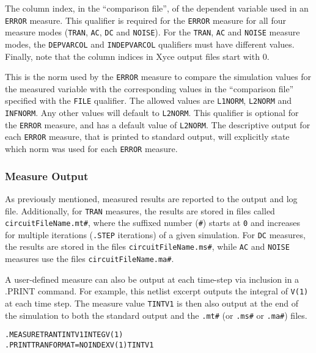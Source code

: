 \begin{Command}
\begin{Arguments}
The column index, in the ``comparison file'', of the dependent
variable used in an {\tt ERROR} measure.  This qualifier is required
for the {\tt ERROR} measure for all four measure modes ({\tt TRAN},
{\tt AC}, {\tt DC} and {\tt NOISE}).  For the {\tt TRAN}, {\tt AC} and
{\tt NOISE} measure modes, the {\tt DEPVARCOL} and {\tt INDEPVARCOL}
qualifiers must have different values.  Finally, note
that the column indices in Xyce output files start with 0.

This is the norm used by the {\tt ERROR} measure to compare the
simulation values for the measured variable with the corresponding
values in the ``comparison file'' specified with the {\tt FILE}
qualifier.  The allowed values are {\tt L1NORM}, {\tt L2NORM} and {\tt
INFNORM}.  Any other values will default to {\tt L2NORM}.  This
qualifier is optional for the {\tt ERROR} measure, and has a default
value of {\tt L2NORM}.  The descriptive output for each {\tt ERROR}
measure, that is printed to standard output, will explicitly state
which norm was used for each {\tt ERROR} measure.

\end{Arguments}

\end {Command}

\subsubsection{Measure Output}
\label{Measure_Measurement_Output}
As previously mentioned, measured results are reported to the output
and log file.  Additionally, for \texttt{TRAN} measures, the results
are stored in files called
\texttt{circuitFileName.mt\#}, where the suffixed number (\texttt{\#}) starts
at \texttt{0} and increases for multiple iterations (\texttt{.STEP}
iterations) of a given simulation. For \texttt{DC} measures, the results are
stored in the files \texttt{circuitFileName.ms\#}, while \texttt{AC} and
\texttt{NOISE} measures use the files \texttt{circuitFileName.ma\#}.

A user-defined measure can also be output at each time-step via
inclusion in a .PRINT command.  For example, this netlist excerpt
outputs the integral of {\tt V(1)} at each time step.  The measure
value {\tt TINTV1} is then also output at the end of the simulation to
both the standard output and the \texttt{.mt\#} (or \texttt{.ms\#}
or \texttt{.ma\#}) files.
\begin{alltt}
.MEASURE TRAN TINTV1 INTEG V(1)
.PRINT TRAN FORMAT=NOINDEX V(1) TINTV1
\end{alltt}

